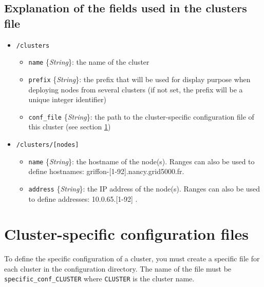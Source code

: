 \documentclass[a4wide,10pt,oneside]{book}
\newcommand{\ypath}[1]{\texttt{#1}}
\newcommand{\yfield}[2]{\texttt{#1} {\small\{{\emph{#2}}\}}:}
\begin{document}
\subsection{Explanation of the fields used in the clusters file\\}
\begin{itemize}
  \item \ypath{/clusters}
  \begin{itemize}
    \item \yfield{name}{String} the name of the cluster
    \item \yfield{prefix}{String} the prefix that will be used for display purpose when deploying nodes from several clusters (if not set, the prefix will be a unique integer identifier)
    \item \yfield{conf\_file}{String} the path to the cluster-specific configuration file of this cluster (see section \ref{sec:specific_config})
  \end{itemize}

  \item \ypath{/clusters/[nodes]}
  \begin{itemize}
    \item \yfield{name}{String} the hostname of the node(s). Ranges can also be used to define hostnames: griffon-[1-92].nancy.grid5000.fr.
    \item \yfield{address}{String} the IP address of the node(s). Ranges can also be used to define addresses: 10.0.65.[1-92] .
  \end{itemize}
\end{itemize}

\section{Cluster-specific configuration files}\label{sec:specific_config}
To define the specific configuration of a cluster, you must create a specific file for each cluster in the configuration directory. The name of the file must be \texttt{specific\_conf\_CLUSTER} where \texttt{CLUSTER} is the cluster name.
\end{document}
